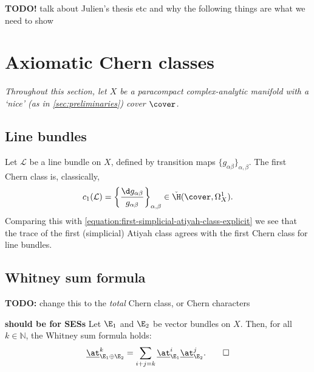 
{\color{red}\textbf{TODO!} talk about Julien's thesis etc and why the following things are what we need to show}

\section{Axiomatic Chern classes} %
\label{sec:axiomatic_chern_classes}

    \emph{Throughout this section, let $X$ be a paracompact complex-analytic manifold with a `nice' (as in \cref{sec:preliminaries}) cover $\cover$.}

    \subsection{Line bundles} %
    \label{sub:line_bundles}

        Let $\mathcal{L}$ be a line bundle on $X$, defined by transition maps $\{g_{\alpha\beta}\}_{\alpha,\beta}$.
        The first Chern class is, classically,
        \begin{equation}\label{equation:first-chern-class-of-line-bundle}
            c_1(\mathcal{L}) = \left\{\frac{\d g_{\alpha\beta}}{g_{\alpha\beta}}\right\}_{\alpha,\beta}\in\check\H(\cover,\Omega_X^1).
        \end{equation}
        Comparing this with \cref{equation:first-simplicial-atiyah-class-explicit} we see that the trace of the first (simplicial) Atiyah class agrees with the first Chern class for line bundles.
    

    \subsection{Whitney sum formula} %
    \label{sub:whitney_sum_formula}

        {\color{red}\textbf{TODO:} change this to the \emph{total} Chern class, or Chern characters}

        \begin{lemma}
            {\color{red}\textbf{should be for SESs}}
            Let $\E_1$ and $\E_2$ be vector bundles on $X$.
            Then, for all $k\in\mathbb{N}$, the Whitney sum formula holds:
            \begin{equation*}
                \underline{\at}^k_{\E_1\oplus\E_2} = \sum_{i+j=k}\underline{\at}^i_{\E_1}\underline{\at}^j_{\E_2}.\qedhere
            \end{equation*}
        \end{lemma}

